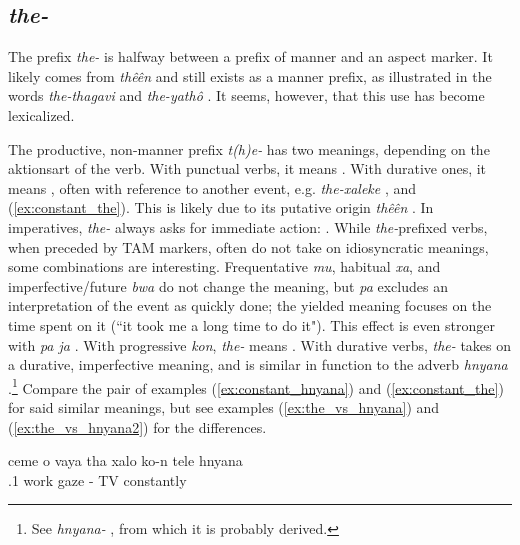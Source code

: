 \subsection{\textit{the-} }
\label{ssec:the}
The prefix \textit{the-} is halfway between a prefix of manner and an aspect marker. It likely comes from \textit{thêên}  and still exists as a manner prefix, as illustrated in the words \textit{the-thagavi}  and \textit{the-yathô} . It seems, however, that this use has become lexicalized.
%
%
%
%
%
%

The productive, non-manner prefix \textit{t(h)e-} has two meanings, depending on the aktionsart of the verb. With punctual verbs, it means . With durative ones, it means , often with reference to another event, e.g. \textit{the-xaleke} , and (\ref{ex:constant_the}). This is likely due to its putative origin \textit{thêên} . In imperatives, \textit{the-} always asks for immediate action: . 
While \textit{the-}prefixed verbs, when preceded by TAM markers, often do not take on idiosyncratic meanings, some combinations are interesting. Frequentative \textit{mu}, habitual \textit{xa}, and imperfective/future \textit{bwa} do not change the meaning, but \textit{pa}  excludes an interpretation of the event as quickly done; the yielded meaning focuses on the time spent on it (``it took me a long time to do it"). This effect is even stronger with \textit{pa ja} . With progressive \textit{kon}, \textit{the-} means . 
With durative verbs, \textit{the-} takes on a durative, imperfective meaning, and is similar in function to the adverb \textit{hnyana} .\footnote{See \textit{hnyana-} , from which it is probably derived.} Compare the pair of examples (\ref{ex:constant_hnyana}) and (\ref{ex:constant_the}) for said similar meanings, but see examples (\ref{ex:the_vs_hnyana}) and (\ref{ex:the_vs_hnyana2}) for the differences.


\ea\label{ex:constant_hnyana} \gll ceme o vaya tha xalo ko-n tele hnyana\\
 .1  work  gaze - TV constantly\\
\glt {} {}
\z 

